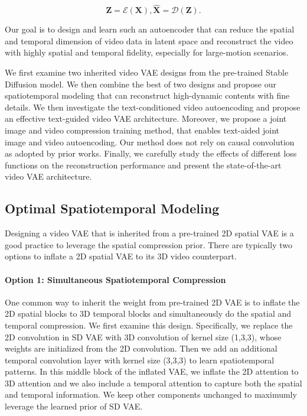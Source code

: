 \begin{equation}
  \mathbf{Z} = \mathcal{E}({\mathbf{X}}), \hat{\mathbf{X}} = \mathcal{D}(\mathbf{Z}). 
\end{equation}


Our goal is to design and learn such an autoencoder that can reduce the spatial and temporal dimension of video data in latent space and reconstruct the video with highly spatial and temporal fidelity, especially for large-motion scenarios.  


We first examine two inherited video VAE designs from the pre-trained Stable Diffusion model. We then combine the best of two designs and propose our spatiotemporal modeling that can reconstruct high-dynamic contents with fine details. 
We then investigate the text-conditioned video autoencoding and propose an effective text-guided video VAE architecture. 
Moreover, we propose a joint image and video compression training method, that enables text-aided joint image and video autoencoding. Our method does not rely on causal convolution as adopted by prior works. Finally, we carefully study the effects of different loss functions on the reconstruction performance and present the state-of-the-art video VAE architecture. 


\subsection{Optimal Spatiotemporal Modeling}
Designing a video VAE that is inherited from a pre-trained 2D spatial VAE is a good practice to leverage the spatial compression prior. There are typically two options to inflate a 2D spatial VAE to its 3D video counterpart. 

\paragraph{Option 1: Simultaneous Spatiotemporal Compression} One common way to inherit the weight from pre-trained 2D VAE is to inflate the 2D spatial blocks to 3D temporal blocks and simultaneously do the spatial and temporal compression. We first examine this design. Specifically, we replace the 2D convolution in SD VAE with 3D convolution of kernel size (1,3,3), whose weights are initialized from the 2D convolution. Then we add an additional temporal convolution layer with kernel size (3,3,3) to learn spatiotemporal patterns. In this middle block of the inflated VAE, we inflate the 2D attention to 3D attention and we also include a temporal attention to capture both the spatial and temporal information. We keep other components unchanged to maximumly leverage the learned prior of SD VAE. 

